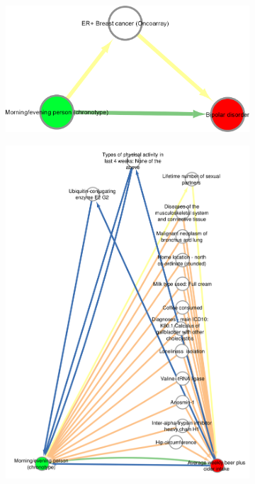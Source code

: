 \documentclass[journal,article,submit,moreauthors,pdftex]{Definitions/mdpi}
\begin{document}
\begin{figure}[htbp]
\begin{subfigure}{.5\linewidth}
\centering
	\includegraphics[width=\linewidth]{Figs/Analysis3/morning_bipolar.png}
\caption{}
\label{chronoBipolar}
\end{subfigure}
\begin{subfigure}{.5\linewidth}
\centering
	\includegraphics[width=\linewidth,keepaspectratio]{Figs/Analysis3/chronoBeer.png}

\end{subfigure}
\end{figure}
\end{document}

